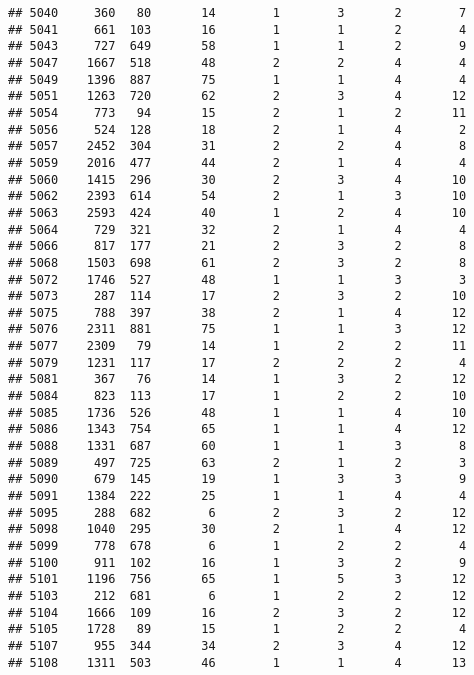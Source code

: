 \documentclass[]{article}
\begin{document}
\begin{verbatim}
## 5040     360   80       14        1        3       2        7
## 5041     661  103       16        1        1       2        4
## 5043     727  649       58        1        1       2        9
## 5047    1667  518       48        2        2       4        4
## 5049    1396  887       75        1        1       4        4
## 5051    1263  720       62        2        3       4       12
## 5054     773   94       15        2        1       2       11
## 5056     524  128       18        2        1       4        2
## 5057    2452  304       31        2        2       4        8
## 5059    2016  477       44        2        1       4        4
## 5060    1415  296       30        2        3       4       10
## 5062    2393  614       54        2        1       3       10
## 5063    2593  424       40        1        2       4       10
## 5064     729  321       32        2        1       4        4
## 5066     817  177       21        2        3       2        8
## 5068    1503  698       61        2        3       2        8
## 5072    1746  527       48        1        1       3        3
## 5073     287  114       17        2        3       2       10
## 5075     788  397       38        2        1       4       12
## 5076    2311  881       75        1        1       3       12
## 5077    2309   79       14        1        2       2       11
## 5079    1231  117       17        2        2       2        4
## 5081     367   76       14        1        3       2       12
## 5084     823  113       17        1        2       2       10
## 5085    1736  526       48        1        1       4       10
## 5086    1343  754       65        1        1       4       12
## 5088    1331  687       60        1        1       3        8
## 5089     497  725       63        2        1       2        3
## 5090     679  145       19        1        3       3        9
## 5091    1384  222       25        1        1       4        4
## 5095     288  682        6        2        3       2       12
## 5098    1040  295       30        2        1       4       12
## 5099     778  678        6        1        2       2        4
## 5100     911  102       16        1        3       2        9
## 5101    1196  756       65        1        5       3       12
## 5103     212  681        6        1        2       2       12
## 5104    1666  109       16        2        3       2       12
## 5105    1728   89       15        1        2       2        4
## 5107     955  344       34        2        3       4       12
## 5108    1311  503       46        1        1       4       13

\end{verbatim}
\end{document}
